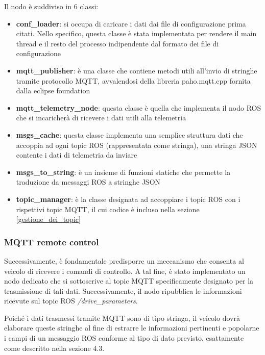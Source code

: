

\noindent Il nodo è suddiviso in 6 classi:

\begin{itemize}
  \item \textbf{conf\_loader}: si occupa di caricare i dati dai file di configurazione prima citati. Nello specifico, questa classe è stata implementata per rendere il main thread e il resto del processo indipendente dal formato dei file di configurazione
  \item \textbf{mqtt\_publisher}: è una classe che contiene metodi utili all'invio di stringhe tramite protocollo MQTT, avvalendosi della libreria paho.mqtt.cpp fornita dalla eclipse foundation 
  \item \textbf{mqtt\_telemetry\_node}: questa classe è quella che implementa il nodo ROS che si incaricherà di ricevere i dati utili alla telemetria
  \item \textbf{msgs\_cache}: questa classe implementa una semplice struttura dati che accoppia ad ogni topic ROS (rappresentata come stringa), una stringa JSON contente i dati di telemetria da inviare
  \item \textbf{msgs\_to\_string}: è un insieme di funzioni statiche che permette la traduzione da messaggi ROS a stringhe JSON
  \item \textbf{topic\_manager}: è la classe designata ad accoppiare i topic ROS con i rispettivi topic MQTT, il cui codice è incluso nella sezione \ref{gestione_dei_topic} 
\end{itemize}

\subsubsection{MQTT remote control} \label{mqtt_remote_control}
Successivamente, è fondamentale predisporre un meccanismo che consenta al veicolo di ricevere i comandi di controllo. A tal fine, è stato implementato un nodo dedicato che si sottoscrive al topic MQTT specificamente designato per la trasmissione di tali dati. Successivamente, il nodo ripubblica le informazioni ricevute sul topic ROS \textit{/drive\_parameters}.

\noindent Poiché i dati trasmessi tramite MQTT sono di tipo stringa, il veicolo dovrà elaborare queste stringhe al fine di estrarre le informazioni pertinenti e popolarne i campi di un messaggio ROS conforme al tipo di dato previsto, esattamente come descritto nella sezione 4.3.

